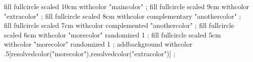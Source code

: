 \definecolor[maincolor]   [r=.5]
\definecolor[extracolor]  [g=.5]
\definecolor[anothercolor][b=.5]
\definecolor[morecolor]   [s=.8]

\startMPpage
    fill fullcircle scaled 10cm withcolor "maincolor" ;
    fill fullcircle scaled  9cm withcolor "extracolor" ;
    fill fullcircle scaled  8cm withcolor complementary "anothercolor" ;
    fill fullcircle scaled  7cm withcolor complemented "anothercolor" ;
    fill fullcircle scaled  6cm withcolor "morecolor" randomized 1 ;
    fill fullcircle scaled  5cm withcolor "morecolor" randomized 1 ;
    addbackground withcolor .5[resolvedcolor("morecolor"),resolvedcolor("extracolor")] ;
\stopMPpage
